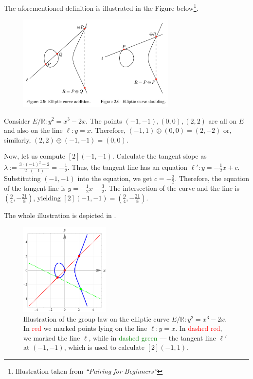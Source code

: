 \documentclass[../lecture-notes.tex]{subfiles}
\begin{document}
The aforementioned definition is illustrated in the Figure below\footnote{Illustration taken from \textit{``Pairing for Beginners''}}.

\begin{figure}[H]
    \centering
    \includegraphics[width=0.7\textwidth]{images/lecture_3/group_law.png}
    \label{fig:group_law}
\end{figure}

\begin{example}
    Consider $E/\mathbb{R}: y^2=x^3-2x$. The points $(-1,-1),(0,0),(2,2)$ are all on $E$ and also on the line $\ell: y=x$. Therefore, $(-1,1) \oplus (0,0) = (2,-2)$ or, similarly, $(2,2) \oplus (-1,-1) = (0,0)$.

    Now, let us compute $[2](-1,-1)$. Calculate the tangent slope as $\lambda := \frac{3\cdot(-1)^2 - 2}{2\cdot(-1)} = -\frac{1}{2}$. Thus, the tangent line has an equation $\ell': y = -\frac{1}{2}x+c$. Substituting $(-1,-1)$ into the equation, we get $c=-\frac{3}{2}$. Therefore, the equation of the tangent line is $y=-\frac{1}{2}x-\frac{3}{2}$. The intersection of the curve and the line is $\left(\frac{9}{4},-\frac{21}{8}\right)$, yielding $[2](-1,-1) = \left(\frac{9}{4},-\frac{21}{8}\right)$.

    The whole illustration is depicted in .

    \begin{figure}[H]
        \centering
        \includegraphics[width=0.4\textwidth]{images/lecture_3/ec_illustration_2.pdf}
        \caption{Illustration of the group law on the elliptic curve $E/\mathbb{R}: y^2=x^3-2x$. In \textcolor{red}{red} we marked points lying on the line $\ell: y=x$. In \textcolor{red}{dashed red}, we marked the line $\ell$, while in \textcolor{green}{dashed green} --- the tangent line $\ell'$ at $(-1,-1)$, which is used to calculate $[2](-1,1)$.}
        \label{fig:ec_2}
    \end{figure}
\end{example}
\end{document}
